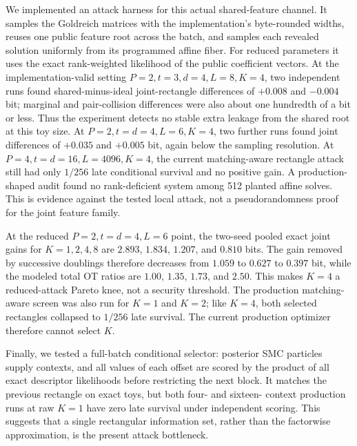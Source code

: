 We implemented an attack harness for this actual shared-feature channel.  It
samples the Goldreich matrices with the implementation's byte-rounded widths,
reuses one public feature root across the batch, and samples each revealed
solution uniformly from its programmed affine fiber.  For reduced parameters
it uses the exact rank-weighted likelihood of the public coefficient vectors.
At the implementation-valid setting $P=2,t=3,d=4,L=8,K=4$, two independent
runs found shared-minus-ideal joint-rectangle differences of $+0.008$ and
$-0.004$ bit; marginal and pair-collision differences were also about one
hundredth of a bit or less.  Thus the experiment detects no stable extra
leakage from the shared root at this toy size.  At
$P=2,t=d=4,L=6,K=4$, two further runs found joint differences of $+0.035$
and $+0.005$ bit, again below the sampling resolution.  At
$P=4,t=d=16,L=4096,K=4$, the current matching-aware
rectangle attack still had only $1/256$ late conditional survival and no
positive gain.  A production-shaped audit found no rank-deficient system among
512 planted affine solves.  This is evidence against the tested local attack,
not a pseudorandomness proof for the joint feature family.

At the reduced $P=2,t=d=4,L=6$ point, the two-seed pooled exact joint gains
for $K=1,2,4,8$ are $2.893$, $1.834$, $1.207$, and $0.810$ bits.  The gain
removed by successive doublings therefore decreases from $1.059$ to $0.627$
to $0.397$ bit, while the modeled total OT ratios are $1.00$, $1.35$, $1.73$,
and $2.50$.  This makes $K=4$ a reduced-attack Pareto knee, not a security
threshold.  The production matching-aware screen was also run for $K=1$ and
$K=2$; like $K=4$, both selected rectangles collapsed to $1/256$ late
survival.  The current production optimizer therefore cannot select $K$.

Finally, we tested a full-batch conditional selector: posterior SMC particles
supply contexts, and all values of each offset are scored by the product of
all exact descriptor likelihoods before restricting the next block.  It
matches the previous rectangle on exact toys, but both four- and sixteen-
context production runs at raw $K=1$ have zero late survival under independent
scoring.  This suggests that a single rectangular information set, rather than
the factorwise approximation, is the present attack bottleneck.

